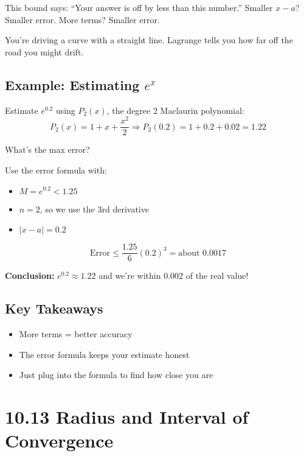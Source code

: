 \documentclass{article}
\begin{document}
This bound says: “Your answer is off by less than this number.”  
Smaller \(x - a\)? Smaller error. More terms? Smaller error.

\begin{tcolorbox}[colback=gray!6,colframe=black,title=Think of it like this:]
You're driving a curve with a straight line.  
Lagrange tells you how far off the road you might drift.
\end{tcolorbox}

\subsection*{Example: Estimating \(e^x\)}

Estimate \(e^{0.2}\) using \(P_2(x)\), the degree 2 Maclaurin polynomial:
\[
P_2(x) = 1 + x + \frac{x^2}{2}
\Rightarrow P_2(0.2) = 1 + 0.2 + 0.02 = 1.22
\]

What’s the max error?

Use the error formula with:
\begin{itemize}
  \item \(M = e^{0.2} < 1.25\)
  \item \(n = 2\), so we use the 3rd derivative
  \item \(|x - a| = 0.2\)
\end{itemize}

\[
\text{Error} \le \frac{1.25}{6} (0.2)^3 = \text{about } 0.0017
\]

\textbf{Conclusion:} \(e^{0.2} \approx 1.22\) and we’re within 0.002 of the real value!

\subsection*{Key Takeaways}
\begin{itemize}
  \item More terms = better accuracy
  \item The error formula keeps your estimate honest
  \item Just plug into the formula to find how close you are
\end{itemize}




\newpage
\section{10.13 Radius and Interval of Convergence}
\end{document}
